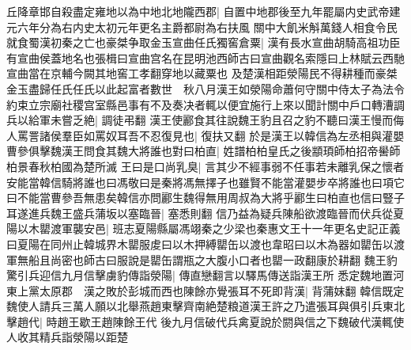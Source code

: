 丘降章邯自殺盡定雍地以為中地北地隴西郡|{
	自置中地郡後至九年罷屬内史武帝建元六年分為右内史太初元年更名主爵都尉為右扶風}
關中大飢米斛萬錢人相食令民就食蜀漢初秦之亡也豪桀争取金玉宣曲任氏獨窖倉粟|{
	漢有長水宣曲胡騎高祖功臣有宣曲侯蓋地名也張楫曰宣曲宫名在昆明池西師古曰宣曲觀名索隱曰上林賦云西馳宣曲當在京輔今闕其地窖工孝翻穿地以藏粟也}
及楚漢相距滎陽民不得耕種而豪桀金玉盡歸任氏任氏以此起富者數世　秋八月漢王如滎陽命蕭何守關中侍太子為法令約束立宗廟社稷宫室縣邑事有不及奏决者輒以便宜施行上來以聞計關中戶口轉漕調兵以給軍未嘗乏絶|{
	調徒弔翻}
漢王使酈食其往說魏王豹且召之豹不聽曰漢王慢而侮人罵詈諸侯羣臣如罵奴耳吾不忍復見也|{
	復扶又翻}
於是漢王以韓信為左丞相與灌嬰曹參俱擊魏漢王問食其魏大將誰也對曰柏直|{
	姓譜柏柏皇氏之後顓頊師柏招帝嚳師柏景春秋柏國為楚所滅}
王曰是口尚乳臭|{
	言其少不經事弱不任事若未離乳保之懷者}
安能當韓信騎將誰也曰馮敬曰是秦將馮無擇子也雖賢不能當灌嬰步卒將誰也曰項它曰不能當曹參吾無患矣韓信亦問酈生魏得無用周叔為大將乎酈生曰柏直也信曰豎子耳遂進兵魏王盛兵蒲坂以塞臨晉|{
	塞悉則翻}
信乃益為疑兵陳船欲渡臨晉而伏兵從夏陽以木罌渡軍襲安邑|{
	班志夏陽縣屬馮翊秦之少梁也秦惠文王十一年更名史記正義曰夏陽在同州止韓城界木罌服䖍曰以木押縛罌缶以渡也韋昭曰以木為器如罌缶以渡軍無船且尚密也師古曰服說是罌缶謂瓶之大腹小口者也罌一政翻康於耕翻}
魏王豹驚引兵迎信九月信擊虜豹傳詣滎陽|{
	傳直戀翻言以驛馬傳送詣漢王所}
悉定魏地置河東上黨太原郡　漢之敗於彭城而西也陳餘亦覺張耳不死即背漢|{
	背蒲妺翻}
韓信既定魏使人請兵三萬人願以北舉燕趙東擊齊南絶楚粮道漢王許之乃遣張耳與俱引兵東北擊趙代|{
	時趙王歇王趙陳餘王代}
後九月信破代兵禽夏說於閼與信之下魏破代漢輒使人收其精兵詣滎陽以距楚

